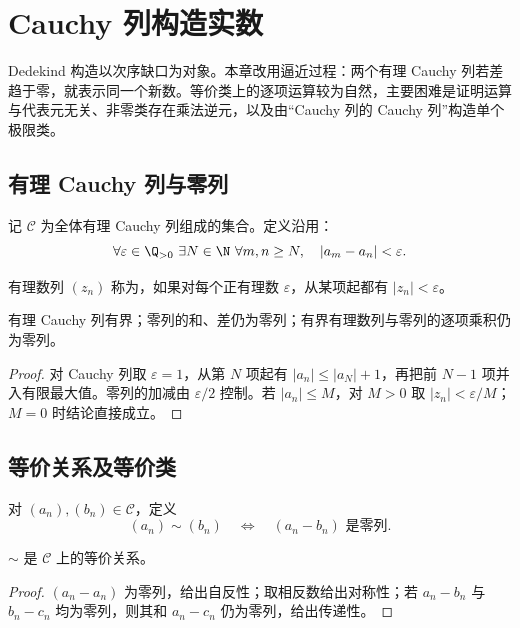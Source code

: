 \chapter{Cauchy 列构造实数}
\label{chap:cauchy-construction}

\begin{chapterguide}
Dedekind 构造以次序缺口为对象。本章改用逼近过程：两个有理 Cauchy 列若差趋于零，就表示同一个新数。等价类上的逐项运算较为自然，主要困难是证明运算与代表元无关、非零类存在乘法逆元，以及由“Cauchy 列的 Cauchy 列”构造单个极限类。
\end{chapterguide}

\section{有理 Cauchy 列与零列}

记 \(\mathcal C\) 为全体有理 Cauchy 列组成的集合。定义沿用：
\[
 \forall\varepsilon\in\Q_{>0}\ \exists N\in\N\
 \forall m,n\ge N,\quad |a_m-a_n|<\varepsilon.
\]

\begin{definition}
有理数列 \((z_n)\) 称为，如果对每个正有理数 \(\varepsilon\)，从某项起都有 \(|z_n|<\varepsilon\)。
\end{definition}

\begin{proposition}
有理 Cauchy 列有界；零列的和、差仍为零列；有界有理数列与零列的逐项乘积仍为零列。
\end{proposition}

\begin{proof}
对 Cauchy 列取 \(\varepsilon=1\)，从第 \(N\) 项起有 \(|a_n|\le|a_N|+1\)，再把前 \(N-1\) 项并入有限最大值。零列的加减由 \(\varepsilon/2\) 控制。若 \(|a_n|\le M\)，对 \(M>0\) 取 \(|z_n|<\varepsilon/M\)；\(M=0\) 时结论直接成立。
\end{proof}

\section{等价关系及等价类}

对 \((a_n),(b_n)\in\mathcal C\)，定义
\[
 (a_n)\sim(b_n)\quad\Longleftrightarrow\quad(a_n-b_n)\text{ 是零列}.
\]

\begin{proposition}
\(\sim\) 是 \(\mathcal C\) 上的等价关系。
\end{proposition}

\begin{proof}
\((a_n-a_n)\) 为零列，给出自反性；取相反数给出对称性；若 \(a_n-b_n\) 与 \(b_n-c_n\) 均为零列，则其和 \(a_n-c_n\) 仍为零列，给出传递性。
\end{proof}

